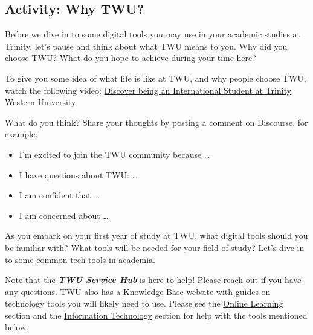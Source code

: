 \documentclass[
]{book}
\providecommand{\tightlist}{%
  \setlength{\itemsep}{0pt}\setlength{\parskip}{0pt}}
\theoremstyle{definition}
\theoremstyle{definition}
\theoremstyle{definition}
\theoremstyle{definition}
\theoremstyle{remark}
\begin{document}
\hypertarget{activity-why-twu}{%
\subsection*{Activity: Why TWU?}\label{activity-why-twu}}

\begin{reflect}
Before we dive in to some digital tools you may use in your academic studies at Trinity, let's pause and think about what TWU means to you. Why did you choose TWU? What do you hope to achieve during your time here?

To give you some idea of what life is like at TWU, and why people choose TWU, watch the following video: \href{https://www.youtube.com/watch?v=VkyZjv3ZbXg}{Discover being an International Student at Trinity Western University}

What do you think? Share your thoughts by posting a comment on Discourse, for example:

\begin{itemize}
\tightlist
\item
  I'm excited to join the TWU community because \ldots{}
\item
  I have questions about TWU: \ldots{}
\item
  I am confident that \ldots{}
\item
  I am concerned about \ldots{}
\end{itemize}
\end{reflect}

As you embark on your first year of study at TWU, what digital tools should you be familiar with? What tools will be needed for your field of study? Let's dive in to some common tech tools in academia.

\begin{feedback}
Note that the
\href{https://trinitywestern.teamdynamix.com/TDClient/1904/Portal/KB/ArticleDet?ID=16267}{\textbf{\emph{TWU
Service Hub}}} is here to help! Please reach out if you have any
questions. TWU also has a
\href{https://trinitywestern.teamdynamix.com/TDClient/1904/Portal/KB/}{Knowledge
Base} website with guides on technology tools you will likely need to
use. Please see the
\href{https://trinitywestern.teamdynamix.com/TDClient/1904/Portal/KB/?CategoryID=4747}{Online
Learning} section and the
\href{https://trinitywestern.teamdynamix.com/TDClient/1904/Portal/KB/?CategoryID=21800}{Information
Technology} section for help with the tools mentioned below.
\end{feedback}
\end{document}
